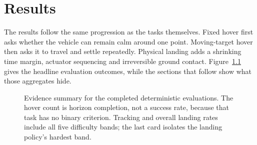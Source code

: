 \chapter{Results}
\label{ch:results}

The results follow the same progression as the tasks themselves. Fixed hover first asks whether
the vehicle can remain calm around one point. Moving-target hover then asks it to travel and
settle repeatedly. Physical landing adds a shrinking time margin, actuator sequencing and
irreversible ground contact. Figure~\ref{fig:result-summary} gives the headline evaluation
outcomes, while the sections that follow show what those aggregates hide.

\begin{figure}[htbp]
  \centering
  \caption{Evidence summary for the completed deterministic evaluations. The hover count is
  horizon completion, not a success rate, because that task has no binary criterion. Tracking
  and overall landing rates include all five difficulty bands; the last card isolates the
  landing policy's hardest band.}
  \label{fig:result-summary}
\end{figure}

